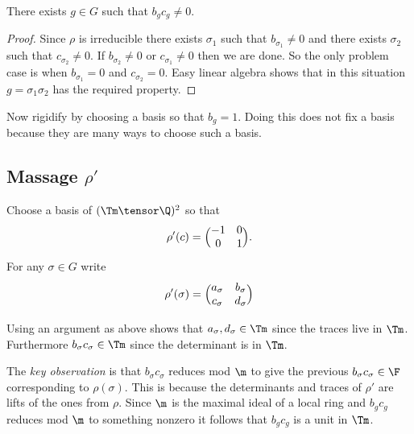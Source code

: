\documentclass{report}
\begin{document}
\begin{proposition}
     There exists $g\in G$ such that $b_g c_g\neq 0$.
\end{proposition}
\begin{proof}
Since $\rho$ is irreducible there exists $\sigma_1$ such that
$b_{\sigma_1}\neq 0$ and there exists $\sigma_2$ such that
$c_{\sigma_2}\neq 0$. If $b_{\sigma_2}\neq 0$ or $c_{\sigma_1}\neq 0$
then we are done. So the only problem case is when
$b_{\sigma_1}=0$ and $c_{\sigma_2}=0$. Easy linear algebra shows
that in this situation $g=\sigma_1 \sigma_2$ has the required property.
\end{proof}

Now rigidify by choosing a basis so that $b_g=1$. Doing this does not
fix a basis because they are many ways to choose such a basis.

\subsection{Massage $\rho'$}
Choose a basis of $(\Tm\tensor\Q)^2$ so that
$$\rho'(c)=\Bigl(\begin{matrix}-1&0\\0&1\end{matrix}\Bigr).$$
For any $\sigma\in G$ write
$$\rho'(\sigma)=\Bigl(
        \begin{matrix}
            a_{\sigma} & b_{\sigma}\\
            c_{\sigma} & d_{\sigma}
        \end{matrix}\Bigr)$$


Using an argument as above shows that $a_{\sigma}, d_{\sigma}\in\Tm$
since the traces live in $\Tm$. Furthermore $b_{\sigma}c_{\sigma}\in\Tm$
since the determinant is in $\Tm$.

The {\em key observation} is that $b_{\sigma} c_{\sigma}$ reduces
mod $\m$ to give the previous $b_{\sigma}c_{\sigma}\in\F$ corresponding
to $\rho(\sigma)$. This is because the determinants and traces of
$\rho'$ are lifts of the ones from $\rho$. Since $\m$ is the maximal
ideal of a local ring and $b_g c_g$ reduces mod $\m$ to something nonzero
it follows that $b_g c_g$ is a unit in $\Tm$.
\end{document}
